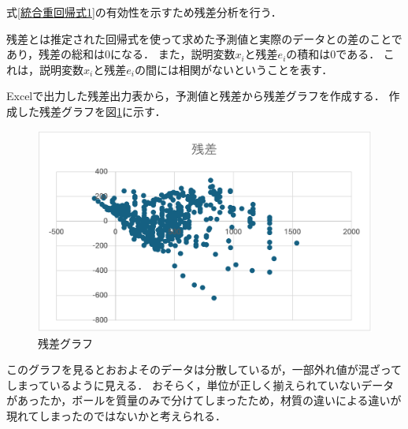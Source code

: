 \documentclass[titlepage,a4paper]{jsarticle}
\begin{document}
式\eqref{統合重回帰式1}の有効性を示すため残差分析を行う．

残差とは推定された回帰式を使って求めた予測値と実際のデータとの差のことであり，残差の総和は$0$になる．
また，説明変数$x_{i}$と残差$e_{i}$の積和は$0$である．
これは，説明変数$x_{i}$と残差$e_{i}$の間には相関がないということを表す．

Excelで出力した残差出力表から，予測値と残差から残差グラフを作成する．
作成した残差グラフを図\ref{残差}に示す．
\begin{figure}[H]
  \centering
  \includegraphics[width=12cm]{img/zansagraph.png}
  \caption{残差グラフ}
  \label{残差}
\end{figure}
このグラフを見るとおおよそのデータは分散しているが，一部外れ値が混ざってしまっているように見える．
おそらく，単位が正しく揃えられていないデータがあったか，ボールを質量のみで分けてしまったため，材質の違いによる違いが現れてしまったのではないかと考えられる．
\end{document}
